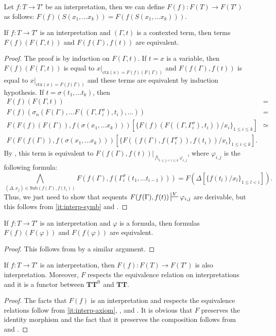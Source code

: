 \documentclass[reqno]{amsart}
\theoremstyle{definition}
\theoremstyle{remark}
\newcommand{\fs}[1]{\mathrm{#1}}
\newcommand{\ft}{\fs{ft}}
\newcommand{\ctx}{\fs{ctx}}
\newcommand{\sub}{\fs{Sub}}
\newcommand{\cat}[1]{\mathbf{#1}}
\newcommand{\algtt}{\cat{TT}}
\numberwithin{figure}{section}
\begin{document}
Let $f : T \to T'$ be an interpretation, then we can define $F(f) : F(T) \to F(T')$ as follows: $F(f)(S(x_1, \ldots x_k)) = F(f(S(x_1, \ldots x_k)))$.

\begin{lem}
If $f : T \to T'$ is an interpretation and $(\Gamma,t)$ is a contexted term, then terms $F(f)(F(\Gamma,t))$ and $F(f(\Gamma),f(t))$ are equivalent.
\end{lem}
\begin{proof}
The proof is by induction on $F(\Gamma,t)$.
If $t = x$ is a variable, then $F(f)(F(\Gamma,t))$ is equal to $x|_{\ctx(x) = F(f)(F(\Gamma))}$ and $F(f(\Gamma),f(t))$ is equal to $x|_{\ctx(x) = F(f(\Gamma))}$ and these terms are equivalent by induction hypothesis.
If $t = \sigma(t_1, \ldots t_k)$, then
\begin{align*}
F(f)(F(\Gamma,t)) & = \\
F(f)(\sigma_n(F(\Gamma), \ldots F((\Gamma, \Gamma^\sigma_i), t_i), \ldots)) & = \\
F(F(f)(F(\Gamma)), f(\sigma(x_1, \ldots x_k)))[\{ F(f)(F((\Gamma, \Gamma^\sigma_i), t_i))/x_i \}_{1 \leq i \leq k}] & \simeq \\
F(F(f(\Gamma)), f(\sigma(x_1, \ldots x_k)))[\{ F((f(\Gamma), f(\Gamma^\sigma_i)), f(t_i))/x_i \}_{1 \leq i \leq k}].
\end{align*}
By , this term is equivalent to $F(f(\Gamma),f(t))|_{\bigwedge_{1 \leq j < i \leq k} \varphi_{i,j}}$, where $\varphi_{i,j}$ is the following formula:
\[ \bigwedge_{(\Delta,x_j) \in \sub(f(\Gamma), f(t_i))} F(f(\Gamma), f(\Gamma^\sigma_i(t_1, \ldots t_{i-1}))) = F(\Delta[\{ f(t_l)/x_l \}_{1 \leq l < i}]). \]
Thus, we just need to show that sequents $F(f(\Gamma),f(t)) \sststile{}{V} \varphi_{i,j}$ are derivable, but this follows from \eqref{it:interp-symb} and .
\end{proof}

\begin{lem}
If $f : T \to T'$ is an interpretation and $\varphi$ is a formula, then formulas $F(f)(F(\varphi))$ and $F(f(\varphi))$ are equivalent.
\end{lem}
\begin{proof}
This follows from  by a similar argument.
\end{proof}

\begin{prop}
If $f : T \to T'$ is an interpretation, then $F(f) : F(T) \to F(T')$ is also interpretation.
Moreover, $F$ respects the equivalence relation on interpretations and it is a functor between $\algtt^\ft$ and $\algtt$.
\end{prop}
\begin{proof}
The facts that $F(f)$ is an interpretation and respects the equivalence relations follow from \eqref{it:interp-axiom}, , and .
It is obvious that $F$ preserves the identity morphism and the fact that it preserves the composition follows from  and .
\end{proof}
\end{document}
